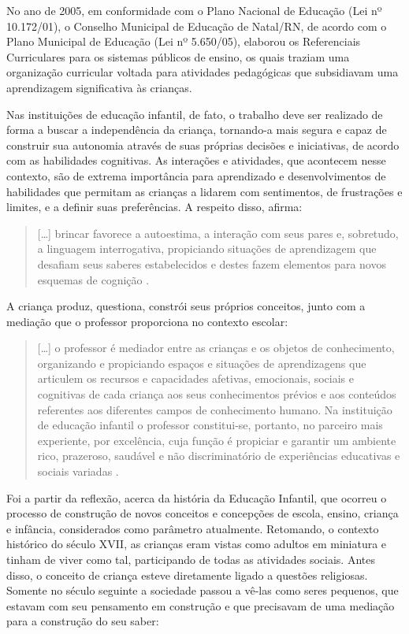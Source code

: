 \begin{refsection}
    No ano de 2005, em conformidade com o Plano Nacional de Educação (Lei nº 10.172/01), o Conselho Municipal de Educação de Natal/RN, de acordo com o Plano Municipal de Educação (Lei nº 5.650/05), elaborou os Referenciais Curriculares para os sistemas públicos de ensino, os quais traziam uma organização curricular voltada para atividades pedagógicas que subsidiavam uma aprendizagem significativa às crianças. 

    Nas instituições de educação infantil, de fato, o trabalho deve ser realizado de forma a buscar a independência da criança, tornando-a mais segura e capaz de construir sua autonomia através de suas próprias decisões e iniciativas, de acordo com as habilidades cognitivas. As interações e atividades, que acontecem nesse contexto, são de extrema importância para aprendizado e desenvolvimentos de habilidades que permitam as crianças a lidarem com sentimentos, de frustrações e limites, e a definir suas preferências. A respeito disso, \textcite{ANTUNES2004Educação} afirma:  

    \begin{quotation}
        [\dots] brincar favorece a autoestima, a interação com seus pares e, sobretudo, a linguagem interrogativa, propiciando situações de aprendizagem que desafiam seus saberes estabelecidos e destes fazem elementos para novos esquemas de cognição \cite[p.~32]{ANTUNES2004Educação}. 
    \end{quotation}

    A criança produz, questiona, constrói seus próprios conceitos, junto com a mediação que o professor proporciona no contexto escolar:

    \begin{quotation}
        [\dots] o professor é mediador entre as crianças e os objetos de conhecimento, organizando e propiciando espaços e situações de aprendizagens que articulem os recursos e capacidades afetivas, emocionais, sociais e cognitivas de cada criança aos seus conhecimentos prévios e aos conteúdos referentes aos diferentes campos de conhecimento humano. Na instituição de educação infantil o professor constitui-se, portanto, no parceiro mais experiente, por excelência, cuja função é propiciar e garantir um ambiente rico, prazeroso, saudável e não discriminatório de experiências educativas e sociais variadas \cite[p.~30]{RCNEI1998}. 
    \end{quotation}

    Foi a partir da reflexão, acerca da história da Educação Infantil, que ocorreu o processo de construção de novos conceitos e concepções de escola, ensino, criança e infância, considerados como parâmetro atualmente. Retomando, o contexto histórico do século XVII, as crianças eram vistas como adultos em miniatura e tinham de viver como tal, participando de todas as atividades sociais. Antes disso, o conceito de criança esteve diretamente ligado a questões religiosas. Somente no século seguinte a sociedade passou a vê-las como seres pequenos, que estavam com seu pensamento em construção e que precisavam de uma mediação para a construção do seu saber: 


\end{refsection}
